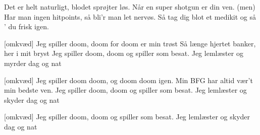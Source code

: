 \documentclass[a4paper,11pt]{article}
\begin{document}
\begin{song}

%
Det er helt naturligt, blodet sprøjter løs.
Når en super shotgun er din ven.
(men) Har man ingen hitpoints, så bli'r man let nervøs.
Så tag dig blot et medikit og så ' du frisk igen.


[omkvæd]
Jeg spiller doom, doom for doom er min trøst
Så længe hjertet banker, her i mit bryst
Jeg spiller doom, doom og spiller som besat.
Jeg lemlæster og myrder dag og nat


[omkvæd]
Jeg spiller doom doom, og doom doom igen.
Min BFG har altid vær't min bedste ven.
Jeg spiller doom, doom og spiller som besat.
Jeg lemlæster og skyder dag og nat


[omkvæd]
Jeg spiller doom, doom og spiller som besat.
Jeg lemlæster og skyder dag og nat



\end{song}
\end{document}
